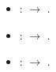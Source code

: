 \begin{itemize}
  \item {}:  $\rightarrow$ .
  \item {}:  $\rightarrow$ .
  \item {}:  $\rightarrow$ .
\end{itemize}
